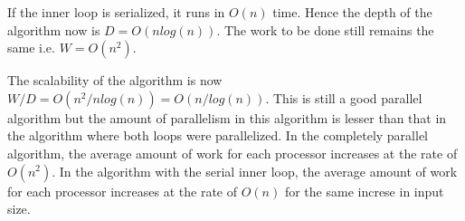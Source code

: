 If the inner loop is serialized, it runs in $O(n)$ time. Hence the depth of the algorithm now is $D = O(nlog(n))$. The work to be done still remains the same i.e. $W=O(n^2)$.

The scalability of the algorithm is now $W/D = O(n^2/nlog(n)) = O(n/log(n))$. This is still a good parallel algorithm but the amount of parallelism in this algorithm is lesser than that in the algorithm where both loops were parallelized. In the completely parallel algorithm, the average amount of work for each processor increases at the rate of $O(n^2)$. In the algorithm with the serial inner loop, the average amount of work for each processor increases at the rate of $O(n)$ for the same increse in input size.